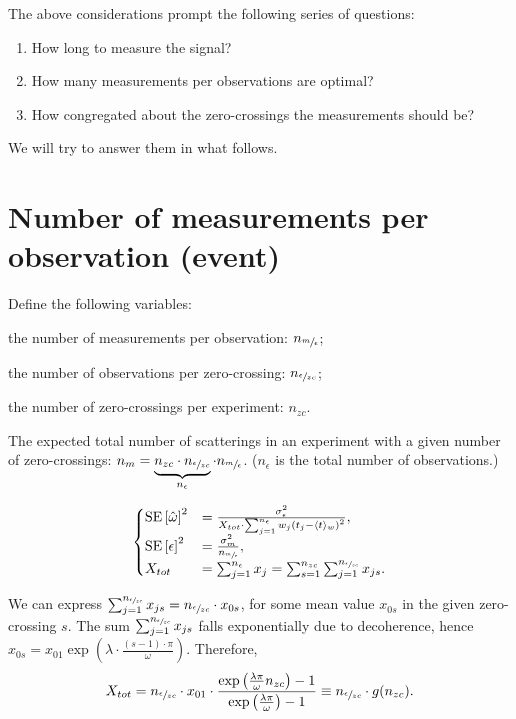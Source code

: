 \documentclass{article}
\newcommand{\obs}{\epsilon}
\newcommand{\meas}{m}
\begin{document}
The above considerations prompt the following series of questions:
\begin{enumerate}
	\item How long to measure the signal?
	\item How many measurements per observations are optimal?
	\item How congregated about the zero-crossings the measurements should be?
\end{enumerate}
We will try to answer them in what follows.

\section{Number of measurements per observation (event)}
\newcommand{\Nmo}{n_{\sfrac{\meas}{\obs}}}
\newcommand{\Nozc}{n_{\sfrac{\obs}{zc}}}
\newcommand{\Nzc}{n_{zc}}
\newcommand{\No}{n_{\obs}}

Define the following variables: \begin{inparaenum}
	\item the number of measurements per observation: $\Nmo$;
	\item the number of observations per zero-crossing: $\Nozc$;
	\item the number of zero-crossings per experiment: $\Nzc$.
\end{inparaenum}

The expected total number of scatterings in an experiment with a given number of zero-crossings: $n_m = \underbrace{\Nzc\cdot\Nozc}_{\No}\cdot\Nmo$. ($\No$ is the total number of observations.)

\begin{equation}
\begin{cases}
	\SE{\hat{\omega}}^2 &= \frac{\SD{\obs}^2}{X_{tot}\cdot\sum_{j=1}^{\No}w_j\bkt{t_j - \avg{t}_w}^2}, \\
	\SE{\obs}^2 &= \frac{\SD{\meas}^2}{\Nmo} ,\\
	X_{tot} &= \sum_{j=1}^{\No} x_j = \sum_{s=1}^{\Nzc}\sum_{j=1}^{\Nozc} x_{js}.
\end{cases}
\end{equation}

We can express $\sum_{j=1}^{\Nozc} x_{js} = \Nozc \cdot x_{0s}$, for some mean value $x_{0s}$ in the given zero-crossing $s$. The sum $\sum_{j=1}^{\Nozc} x_{js}$ falls exponentially due to decoherence, hence $x_{0s} = x_{01}\exp{(\lambda\cdot \frac{(s-1)\cdot\pi}{\omega})}$. Therefore,
\[
	X_{tot} = \Nozc\cdot x_{01} \cdot \frac{\exp{\bkt{\frac{\lambda\pi}{\omega}\Nzc}}-1}{\exp{\bkt{\frac{\lambda\pi}{\omega}}}-1} \equiv \Nozc \cdot g(\Nzc).
\]
\end{document}
